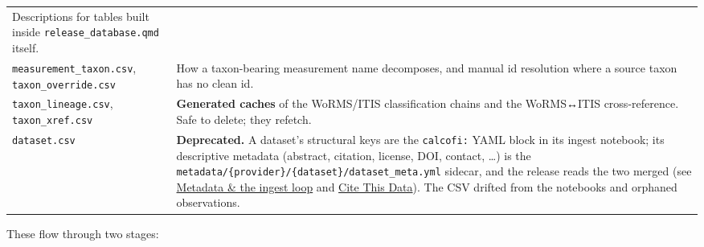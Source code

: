 \documentclass[
  letterpaper,
  DIV=11,
  numbers=noendperiod]{scrreprt}
\begin{document}
\begin{longtable}[]{@{}
  >{\raggedright\arraybackslash}p{}
  >{\raggedright\arraybackslash}p{}@{}}
Descriptions for tables built inside \texttt{release\_database.qmd}
itself. \\
\texttt{measurement\_taxon.csv}, \texttt{taxon\_override.csv} & How a
taxon-bearing measurement name decomposes, and manual id resolution
where a source taxon has no clean id. \\
\texttt{taxon\_lineage.csv}, \texttt{taxon\_xref.csv} &
\textbf{Generated caches} of the WoRMS/ITIS classification chains and
the WoRMS↔ITIS cross-reference. Safe to delete; they refetch. \\
\texttt{dataset.csv} & \textbf{Deprecated.} A dataset's structural keys
are the \texttt{calcofi:} YAML block in its ingest notebook; its
descriptive metadata (abstract, citation, license, DOI, contact, \ldots)
is the \texttt{metadata/\{provider\}/\{dataset\}/dataset\_meta.yml}
sidecar, and the release reads the two merged (see
\href{metadata.qmd}{Metadata \& the ingest loop} and
\href{cite.qmd}{Cite This Data}). The CSV drifted from the notebooks and
orphaned observations. \\
\end{longtable}

These flow through two stages:
\end{document}
